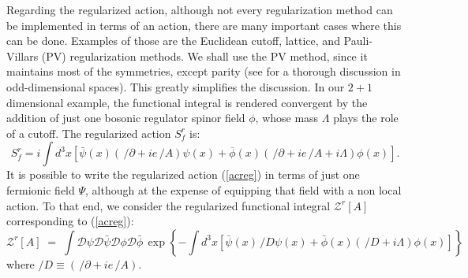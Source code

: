\documentclass[a4paper,12pt]{article}
\newcommand{\Dcslash}{/\!\!\!\! D}
\newcommand{\spartial}{/\!\!\!\partial}
\newcommand{\Aslash}{/\!\!\!\!A}
\begin{document}
Regarding the regularized action, although not every regularization
method can be implemented in terms of an action, there are many
important cases where this can be done.  Examples of those are the
Euclidean cutoff, lattice, and Pauli-Villars (PV) regularization
methods. We shall use the PV method, since it maintains most of the
symmetries, except parity (see \cite{adm} for a thorough
discussion in odd-dimensional spaces).  This greatly simplifies the discussion.
In our $2+1$ dimensional example, the functional integral is rendered
convergent by the addition of just one bosonic regulator spinor
field $\phi$,
whose mass $\Lambda$ plays the role of a cutoff.  The regularized
action $S_f^r$ is:
\begin{equation}
\label{acreg}
S_f^r=i\int d^3x\left[\bar{\psi}(x)(\,\spartial+ie\,\Aslash )\psi(x) +
\overline{\phi}(x)(\,\spartial+ie\,\Aslash +i\Lambda)\phi(x)\right].
\end{equation}
It is possible to write the regularized action (\ref{acreg}) in terms
of just one fermionic field $\Psi$, although at the expense of
equipping that field with a non local action. To that end, we consider
the regularized functional integral $\mathcal{Z}^r[A]$ corresponding
to (\ref{acreg}):
\begin{equation}
\label{Z}
\mathcal{Z}^r[A]\;=\; \int\mathcal{D}\psi\mathcal{D}\bar{\psi}
\mathcal{D}\phi\mathcal{D}\bar{\phi} \,
\exp\left\{-\int d^3x
  [\bar{\psi}(x)\,\Dcslash\psi(x)+\bar{\phi}(x)
(\,\Dcslash+i\Lambda)\phi(x)] \right\}
\end{equation}
where $\Dcslash \equiv (\,\spartial+ie\,\Aslash )$.
\end{document}
